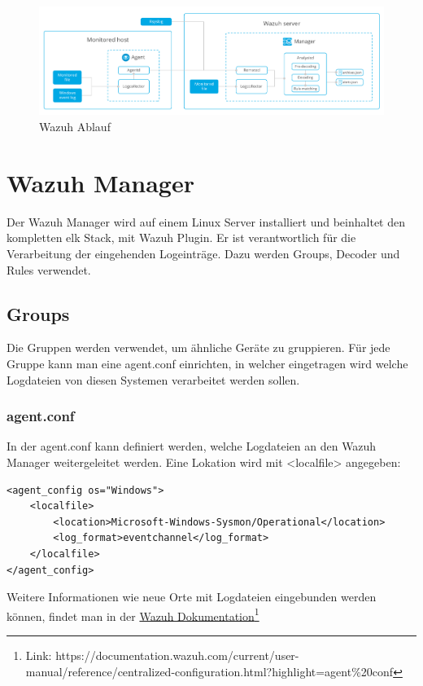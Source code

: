 \begin{figure}[H]
    \centering
    \includegraphics[width=\linewidth]{../img/wazuh-ablauf.png}
    \caption[Wazuh Ablauf]{Wazuh Ablauf\footnotemark}
\end{figure}


\section{Wazuh Manager}
Der Wazuh Manager wird auf einem Linux Server installiert und beinhaltet den kompletten \acrshort{elk} Stack, mit Wazuh Plugin. 
Er ist verantwortlich für die Verarbeitung der eingehenden Logeinträge. 
Dazu werden Groups, Decoder und Rules verwendet. 

\subsection{Groups}
Die Gruppen werden verwendet, um ähnliche Geräte zu gruppieren.
Für jede Gruppe kann man eine agent.conf einrichten, in welcher eingetragen wird welche Logdateien von diesen Systemen verarbeitet werden sollen. 

\subsubsection{agent.conf}
In der agent.conf kann definiert werden, welche Logdateien an den Wazuh Manager weitergeleitet werden. 
Eine Lokation wird mit <localfile> angegeben:
\begin{lstlisting}
<agent_config os="Windows">
    <localfile>
        <location>Microsoft-Windows-Sysmon/Operational</location>
        <log_format>eventchannel</log_format>
    </localfile>
</agent_config>
\end{lstlisting}
Weitere Informationen wie neue Orte mit Logdateien eingebunden werden können, findet man in der \href{https://documentation.wazuh.com/current/user-manual/reference/centralized-configuration.html?highlight=agent%20conf}{Wazuh Dokumentation}\footnote{Link: https://documentation.wazuh.com/current/user-manual/reference/centralized-configuration.html?highlight=agent\%20conf}\\

